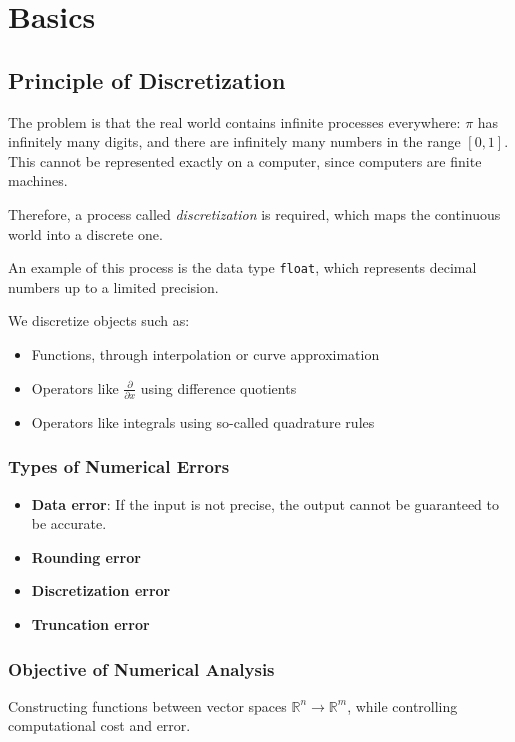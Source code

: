 \documentclass{article}
\begin{document}
\section{Basics}
\subsection{Principle of Discretization}
The problem is that the real world contains infinite processes everywhere: $\pi$ has infinitely many digits, and there are infinitely many numbers in the range $[0,1]$. This cannot be represented exactly on a computer, since computers are finite machines.

Therefore, a process called \textit{discretization} is required, which maps the continuous world into a discrete one.

An example of this process is the data type \texttt{float}, which represents decimal numbers up to a limited precision.

We discretize objects such as:
\begin{itemize}
  \item Functions, through interpolation or curve approximation
  \item Operators like $\frac{\partial}{\partial x}$ using difference quotients
  \item Operators like integrals using so-called quadrature rules
\end{itemize}

\subsubsection{Types of Numerical Errors}
\begin{itemize}
  \item \textbf{Data error}: If the input is not precise, the output cannot be guaranteed to be accurate.
  \item \textbf{Rounding error}
  \item \textbf{Discretization error}
  \item \textbf{Truncation error}
\end{itemize}

\subsubsection{Objective of Numerical Analysis}
Constructing functions between vector spaces $\mathbb{R}^n \to \mathbb{R}^m$, while controlling computational cost and error.
\end{document}
